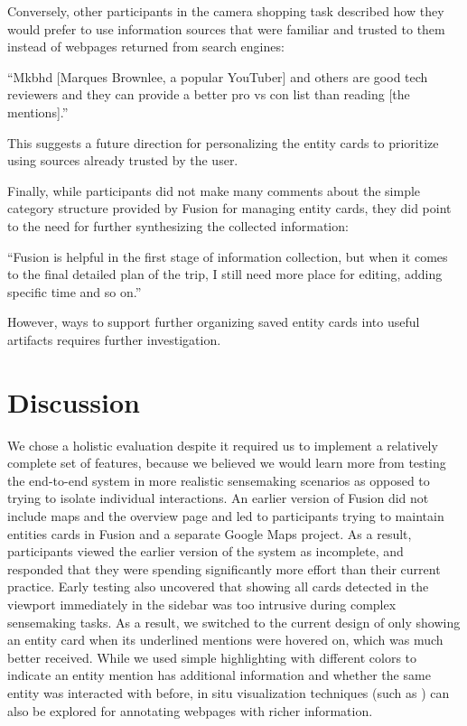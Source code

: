 \noindent Conversely, other participants in the camera shopping task described how they would prefer to use information sources that were familiar and trusted to them instead of webpages returned from search engines:

\begin{tightquote}
``Mkbhd [Marques Brownlee, a popular YouTuber] and others are good tech reviewers and they can provide a better pro vs con list than reading [the mentions].''
\end{tightquote}

\noindent This suggests a future direction for personalizing the entity cards to prioritize using sources already trusted by the user.

Finally, while participants did not make many comments about the simple category structure provided by Fusion for managing entity cards, they did point to the need for further synthesizing the collected information:

\begin{tightquote}
``Fusion is helpful in the first stage of information collection, but when it comes to the final detailed plan of the trip, I still need more place for editing, adding specific time and so on.''
\end{tightquote}


However, ways to support further organizing saved entity cards into useful artifacts requires further investigation. 



\section{Discussion}

We chose a holistic evaluation despite it required us to implement a relatively complete set of features, because we believed we would learn more from testing the end-to-end system in more realistic sensemaking scenarios as opposed to trying to isolate individual interactions. An earlier version of Fusion did not include maps and the overview page and led to participants trying to maintain entities cards in Fusion and a separate Google Maps project. As a result, participants viewed the earlier version of the system as incomplete, and responded that they were spending significantly more effort than their current practice. Early testing also uncovered that showing all cards detected in the viewport immediately in the sidebar was too intrusive during complex sensemaking tasks. As a result, we switched to the current design of only showing an entity card when its underlined mentions were hovered on, which was much better received. While we used simple highlighting with different colors to indicate an entity mention has additional information and whether the same entity was interacted with before, in situ visualization techniques (such as \cite{hoffswell2018augmenting}) can also be explored for annotating webpages with richer information. 

